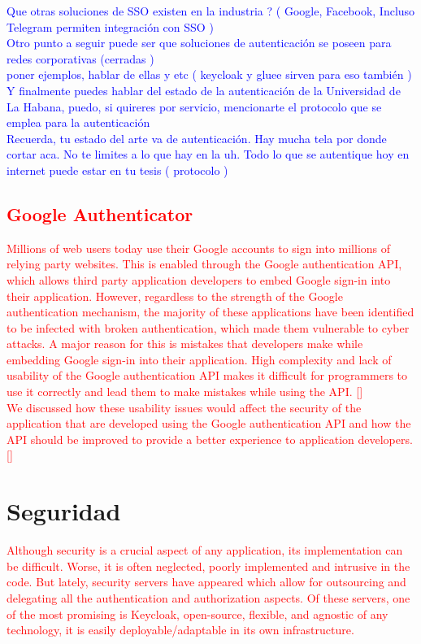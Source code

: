 	
	\textcolor{blue}{Que otras soluciones de SSO existen en la industria ? ( Google, Facebook, Incluso Telegram permiten integración con SSO )}
	\\
	\textcolor{blue}{Otro punto a seguir puede ser que soluciones de autenticación se poseen para redes corporativas  (cerradas )\\
	poner ejemplos, hablar de ellas y etc ( keycloak y gluee sirven para eso también )}
	\\
	\textcolor{blue}{Y finalmente puedes hablar del estado de la autenticación de la Universidad de La Habana, puedo, si quireres por servicio, mencionarte el protocolo que se emplea para la autenticación}
	\\
	\textcolor{blue}{Recuerda, tu estado del arte va de autenticación. Hay mucha tela por donde cortar aca. No te limites a lo que hay en la uh. Todo lo que se autentique hoy en internet puede estar en tu tesis ( protocolo )}
	
	\textcolor{red}{
	\subsection{Google Authenticator}
	Millions of web users today use their Google accounts to sign into millions of relying party websites. This is enabled through the Google authentication API, which allows third party application developers to embed Google sign-in into their application. However, regardless to the strength of the Google authentication mechanism, the majority of these applications have been identified to be infected with broken authentication, which made them vulnerable to cyber attacks. A major reason for this is mistakes that developers make while embedding Google sign-in into their application. High complexity and lack of usability of the Google authentication API makes it difficult for programmers to use it correctly and lead them to make mistakes while using the API. [\cite{wijayarathna2019empirical}]
	\\
	We discussed how these usability issues would affect the security of the application that are developed using the Google authentication API and how the API should be improved to provide a better experience to application developers. [\cite{wijayarathna2019empirical}]}

\section{Seguridad}
\textcolor{red}{
Although security is a crucial aspect of any application, its implementation can be difficult. Worse, it is often neglected, poorly implemented and intrusive in the code. But lately, security servers have appeared which allow for outsourcing and delegating all the authentication and authorization aspects. Of these servers, one of the most promising is Keycloak, open-source, flexible, and agnostic of any technology, it is easily deployable/adaptable in its own infrastructure.}